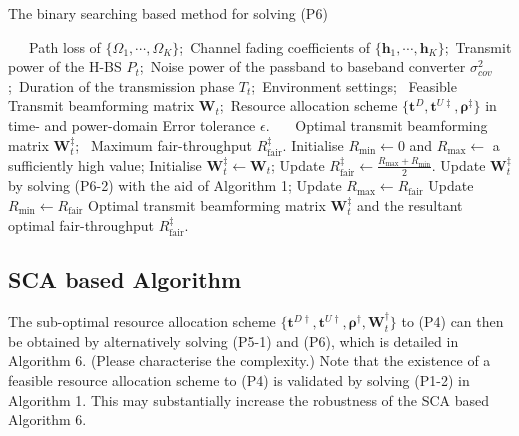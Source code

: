 \documentclass[12pt,draftcls,onecolumn,journal]{IEEEtran}
\begin{document}
\begin{algorithm}[!t]
	\caption{The binary searching based method for solving (P6)}
	\footnotesize
	\begin{algorithmic}[1]
		\REQUIRE ~~\
		Path loss of $\{\Omega_1,\cdots,\Omega_K\}$;\
		Channel fading coefficients of $\{\mathbf{h}_1,\cdots,\mathbf{h}_K\}$;\
		Transmit power of the H-BS $P_{t}$;\		
		Noise power of the passband to baseband converter $\sigma^2_{cov}$;\
		Duration of the transmission phase $T_t$;\
		Environment settings; \
		Feasible Transmit beamforming matrix $\mathbf{W}_t$;\
		Resource allocation scheme $\{\mathbf{t}^{D}, \mathbf{t}^{U\ddagger}, \boldsymbol{\rho}^{\ddagger}\}$ in time- and power-domain
		Error tolerance $\epsilon$.
		\ENSURE ~~\
		Optimal transmit beamforming matrix $\mathbf{W}_t^{\ddagger}$; \
		Maximum fair-throughput $R_{\text{fair}}^{\ddagger}$.
		\STATE Initialise $R_{\min}\leftarrow 0$ and $R_{\max}\leftarrow$ a sufficiently high value;
		\STATE Initialise $\mathbf{W}_t^{\ddagger} \leftarrow \mathbf{W}_t$;
			\STATE Update $R_{\text{fair}}^{\ddagger} \leftarrow \frac{R_{\max} + R_{\min}}{2}$.
			\STATE Update $\mathbf{W}_t^{\ddagger}$ by solving (P6-2) with the aid of Algorithm 1;
			\IF {$\text{Tr}(\mathbf{W}_t^{\ddagger}) > 1$}
				\STATE Update $R_{\max} \leftarrow R_{\text{fair}}$
			\ELSE
				\STATE Update $R_{\min} \leftarrow R_{\text{fair}}$
			\ENDIF
		\ENDWHILE
		\RETURN Optimal transmit beamforming matrix $\mathbf{W}_t^{\ddagger}$ and the resultant optimal fair-throughput $R_{\text{fair}}^{\ddagger}$.
	\end{algorithmic}
\end{algorithm}

\subsection{SCA based Algorithm}

The sub-optimal resource allocation scheme $\{\mathbf{t}^{D\dagger}, \mathbf{t}^{U\dagger}, \boldsymbol{\rho}^{\dagger}, \mathbf{W}_t^{\dagger}\}$ to (P4) can then be obtained by alternatively solving (P5-1) and (P6), which is detailed in Algorithm 6. {\color{red} (Please characterise the complexity.)}  Note that the existence of a feasible resource allocation scheme to (P4) is validated by solving (P1-2) in Algorithm 1. This may substantially increase the robustness of the SCA based Algorithm 6.
\end{document}
